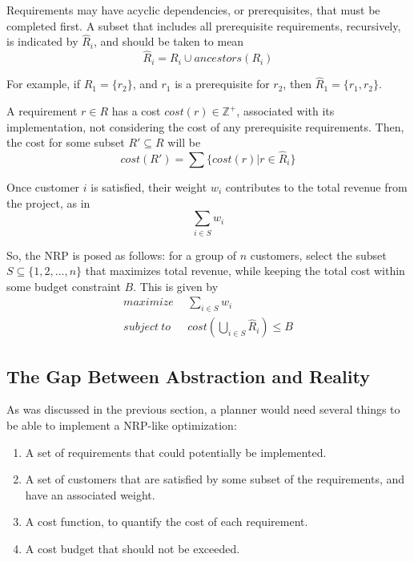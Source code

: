 \documentclass[letterpaper]{report}
\begin{document}
Requirements may have acyclic dependencies, or prerequisites, that must be completed first. A subset that includes all prerequisite requirements, recursively, is indicated by $\hat{R}_i$, and should be taken to mean
\begin{equation}
\hat{R}_i = R_i \cup ancestors(R_i)
\end{equation}

For example, if $R_1 = \{r_2\}$, and $r_1$ is a prerequisite for $r_2$, then $\hat{R}_1 = \{r_1,r_2\}$.

A requirement $r \in R$ has a cost $cost(r) \in \mathbb{Z}^+$, associated with its implementation, not considering the cost of any prerequisite requirements. Then, the cost for some subset $R' \subseteq R$ will be
\begin{equation}
cost(R') = \sum \{cost(r) | r \in \hat{R}_i \}
\end{equation}

Once customer $i$ is satisfied, their weight $w_i$ contributes to the total revenue from the project, as in
\begin{equation}
\sum_{i \in S} w_i
\end{equation}

So, the NRP is posed as follows: for a group of $n$ customers, select the subset $S \subseteq \{ 1,2,...,n \}$ that maximizes total revenue, while keeping the total cost within some budget constraint $B$. This is given by 
\begin{equation}
\begin{split}
maximize~~& \sum_{i \in S} w_i \\
subject~to~~~& cost(\bigcup_{i \in S} \hat{R}_i) \le B
\end{split}
\end{equation}

\subsection*{The Gap Between Abstraction and Reality}
As was discussed in the previous section, a planner would need several things to be able to implement a NRP-like optimization:
\begin{enumerate}
\item{A set of requirements that could potentially be implemented.}
\item{A set of customers that are satisfied by some subset of the requirements, and have an associated weight.}
\item{A cost function, to quantify the cost of each requirement.}
\item{A cost budget that should not be exceeded.}
\end{enumerate}
\end{document}
